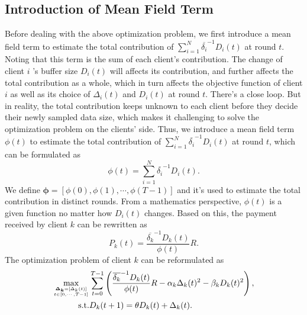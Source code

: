 \documentclass{article}
\theoremstyle{plain}
\theoremstyle{definition}
\theoremstyle{remark}
\begin{document}
\subsection{Introduction of Mean Field Term}
Before dealing with the above optimization problem, we first introduce a mean field term to estimate the total contribution of $\sum_{i=1}^{N}\overline{\delta_i}^{-1}D_i(t)$ at round $t$. 
Noting that this term is the sum of each client's contribution. The change of client $i$ 's buffer size $D_i(t)$ will affects its contribution, and further affects the total contribution as a whole, which in turn affects the objective function of client $i$ as well as its choice of $\Delta_i(t)$ and $D_i(t)$ at round $t$. There's a close loop.
But in reality, the total contribution keeps unknown to each client before they decide their newly sampled data size, which makes it challenging to solve the optimization problem on the clients' side. 
Thus, we introduce a mean field term $\phi(t)$ to estimate the total contribution of $\sum_{i=1}^{N} \overline{\delta_i}^{-1}D_i(t)$ at round $t$, which can be formulated as
\begin{equation}
  \phi(t) = \sum_{i=1}^{N} \overline{\delta_i}^{-1}D_i(t).
\end{equation}
We define $\boldsymbol{\phi}=[\phi(0), \phi(1), \cdots, \phi(T-1)]$ and it's used to estimate the total contribution in distinct rounds.
From a mathematics perspective, $\phi(t)$ is a given function no matter how $D_i(t)$ changes.
Based on this, the payment received by client $k$ can be rewritten as 
\begin{equation}
  P_k(t) = \frac{\overline{\delta_k}^{-1}D_k(t)}{\phi(t)} R.
\end{equation}
The optimization problem of client $k$ can be reformulated as
\begin{equation}
  \begin{aligned}
    \max_{\boldsymbol{\Delta_k}=[\Delta_k(t)] \atop t \in [0,\cdots,T-1]} & \sum_{t=0}^{T-1} \left(\frac{\overline{\delta_k}^{-1}D_k(t)}{\phi(t)}R - \alpha_k\Delta_k(t)^2 - \beta_kD_k(t)^2\right), \\
    \text{s.t.} & D_k(t+1) = \theta D_k(t) + \Delta_k(t).
  \end{aligned}  
\end{equation}
\end{document}
